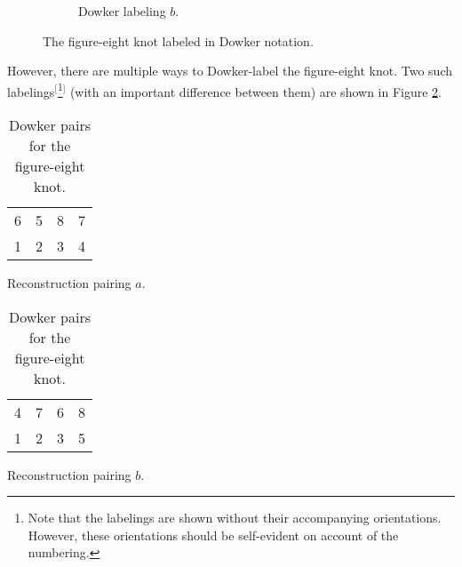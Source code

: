 \documentclass[titlepage]{article}
\begin{document}
\begin{figure}[h!]
\begin{subfigure}[b]{0.3\linewidth}
        \caption{Dowker labeling $b$.}
        \label{fig:fig8Dowkerb}
    \end{subfigure}
    \caption{The figure-eight knot labeled in Dowker notation.}
    \label{fig:fig8Dowker}
\end{figure}

However, there are multiple ways to Dowker-label the figure-eight knot. Two such labelings$^[$\footnote{Note that the labelings are shown without their accompanying orientations. However, these orientations should be self-evident on account of the numbering.}$^]$ (with an important difference between them) are shown in Figure \ref{fig:fig8Dowker}.\par

\begin{table}[h!]
    \centering
    \begin{subtable}[b]{0.3\linewidth}
        \centering
        \begin{tabular}{cccc}
            6 & 5 & 8 & 7\\
            1 & 2 & 3 & 4
        \end{tabular}
        \caption{Reconstruction pairing $a$.}
        \label{tab:fig8Dowkera}
    \end{subtable}
    \begin{subtable}[b]{0.3\linewidth}
        \centering
        \begin{tabular}{cccc}
            4 & 7 & 6 & 8\\
            1 & 2 & 3 & 5
        \end{tabular}
        \caption{Reconstruction pairing $b$.}
        \label{tab:fig8Dowkerb}
    \end{subtable}
    \caption{Dowker pairs for the figure-eight knot.}
    \label{tab:fig8Dowker}
\end{table}
\end{document}
